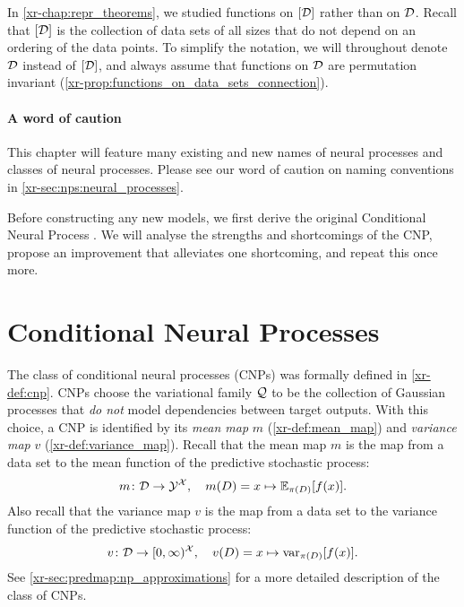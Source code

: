 \documentclass[12pt]{report}
\newcommand{\xrprefix}[1]{xr-#1}
\begin{document}
In \cref{\xrprefix{chap:repr_theorems}}, we studied functions on $[\mathcal{D}]$ rather than on $\mathcal{D}$.
Recall that $[\mathcal{D}]$ is the collection of data sets of all sizes that do not depend on an ordering of the data points.
To simplify the notation, we will throughout denote $\mathcal{D}$ instead of $[\mathcal{D}]$, and always assume that functions on $\mathcal{D}$ are permutation invariant (\cref{\xrprefix{prop:functions_on_data_sets_connection}}).

\paragraph{A word of caution}
This chapter will feature many existing and new names of neural processes and classes of neural processes.
Please see our word of caution on naming conventions in \cref{\xrprefix{sec:nps:neural_processes}}.

Before constructing any new models, we first derive the original Conditional Neural Process \parencite[CNP;][]{Garnelo:2018:Conditional_Neural_Processes}.
We will analyse the strengths and shortcomings of the CNP, propose an improvement that alleviates one shortcoming,
and repeat this once more.


\section{Conditional Neural Processes}
\label{sec:convcnps:cnps}

The class of conditional neural processes (CNPs) was formally defined in \cref{\xrprefix{def:cnp}}.
CNPs choose the variational family $\mathcal{Q}$ to be the collection of Gaussian processes that \emph{do not} model dependencies between target outputs.
With this choice, a CNP is identified by its \emph{mean map} $m$ (\cref{\xrprefix{def:mean_map}}) and \emph{variance map} $v$ (\cref{\xrprefix{def:variance_map}}).
Recall that the mean map $m$ is the map from a data set to the mean function of the predictive stochastic process:%
\begin{equation}
    m\colon \mathcal{D} \to \mathcal{Y}^{\mathcal{X}}, \quad
    m(D) = x \mapsto \mathbb{E}_{\pi(D)}[f(x)].
\end{equation}
Also recall that the variance map $v$ is the map from a data set to the variance function of the predictive stochastic process:
\begin{equation}
    v\colon \mathcal{D} \to [0, \infty)^{\mathcal{X}}, \quad
    v(D) = x \mapsto \operatorname{var}_{\pi(D)}[f(x)].
\end{equation}
See \cref{\xrprefix{sec:predmap:np_approximations}} for a more detailed description of the class of CNPs.
\end{document}
